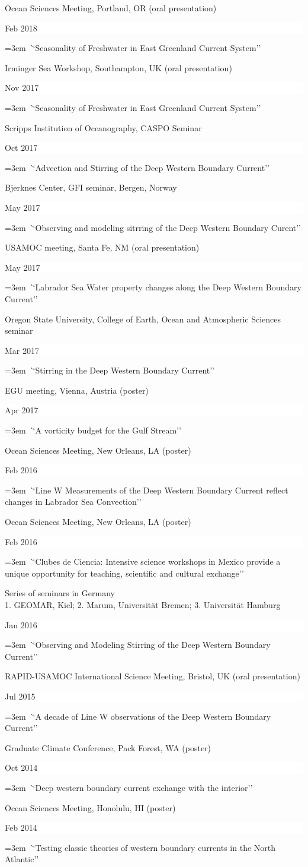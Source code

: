 \documentclass[paper=letter,fontsize=11pt]{scrartcl} %
\newcommand{\sepspace}{\vspace*{3mm}}		%
\newcommand{\TalkEntry}[3]{
		\noindent #1 \hfill      %
		\colorbox{White}{%
			\parbox{6em}{%
			\hfill\color{Black}#2}} \par  %
		\noindent\hangindent=3em\hangafter=0 \textit ``#3''\sepspace} %
\begin{document}
\TalkEntry{Ocean Sciences Meeting, Portland, OR (oral presentation)}{Feb 2018}{Seasonality of Freshwater in East Greenland Current System}

\TalkEntry{Irminger Sea Workshop, Southampton, UK (oral presentation)}{Nov 2017}{Seasonality of Freshwater in East Greenland Current System}

\TalkEntry{Scripps Institution of Oceanography, CASPO Seminar}{Oct 2017}{Advection and Stirring of the Deep Western Boundary Current}

\TalkEntry{Bjerknes Center, GFI seminar, Bergen, Norway}{May 2017}{Observing and modeling sitrring of the Deep Western Boundary Curent}

\TalkEntry{USAMOC meeting, Santa Fe, NM (oral presentation)}{May 2017}{Labrador Sea Water property changes along the Deep Western Boundary Current}

\TalkEntry{Oregon State University, College of Earth, Ocean and Atmospheric Sciences seminar}{Mar 2017}{Stirring in the Deep Western Boundary Current}

\TalkEntry{EGU meeting, Vienna, Austria (poster)}{Apr 2017}{A vorticity budget for the Gulf Stream}

\TalkEntry{Ocean Sciences Meeting, New Orleans, LA (poster)}{Feb 2016}{Line W Measurements of the Deep Western Boundary Current reflect changes in Labrador Sea Convection}

\TalkEntry{Ocean Sciences Meeting, New Orleans, LA (poster)}{Feb 2016}{Clubes de Ciencia: Intensive science workshops in Mexico provide a unique opportunity for teaching, scientific and cultural exchange}

\TalkEntry{Series of seminars in Germany \\ 1. GEOMAR, Kiel; 2. Marum, Universit\"at Bremen; 3. Universit\"at Hamburg}{Jan 2016}{Observing and Modeling Stirring of the Deep Western Boundary Current}

\TalkEntry{RAPID-USAMOC International Science Meeting, Bristol, UK (oral presentation)}{Jul 2015}{A decade of Line W observations of the Deep Western Boundary Current}

\TalkEntry{Graduate Climate Conference, Pack Forest, WA (poster)}{Oct 2014}{Deep western boundary current exchange with the interior}

\TalkEntry{Ocean Sciences Meeting, Honolulu, HI (poster)}{Feb 2014}{Testing classic theories of western boundary currents in the North Atlantic}

\end{document}
